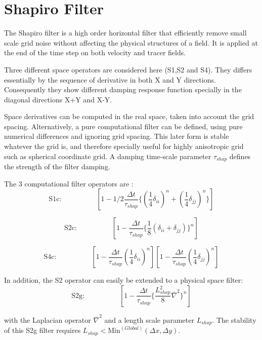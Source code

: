 
\section{Shapiro Filter} 
\label{sec:shapiro-filter}

The Shapiro filter \cite{Shapiro_70} is a high order horizontal 
filter that efficiently remove small scale grid noise 
without affecting the physical structures of a field. 
It is applied at the end of the time step %
on both velocity and tracer fields.

Three different space operators are considered here (S1,S2 and S4).
They differs essentially by the sequence of derivative in
both X and Y directions. Consequently they show different 
damping response function specially in the diagonal directions 
X+Y and X-Y.

Space derivatives can be computed in the real space, 
taken into account the grid spacing. 
Alternatively, a pure computational filter can be defined,
using pure numerical differences and ignoring 
grid spacing. 
This later form is stable whatever the grid is, and therefore
specially useful for highly anisotropic grid such as spherical 
coordinate grid.
A damping time-scale parameter $\tau_{shap}$ 
defines the strength of the filter damping.

The 3 computational filter operators are :
$$
\mathrm{S1c:}\hspace{2cm}
[1 - 1/2 \frac{\Delta t}{\tau_{shap}}
   \{ (\frac{1}{4}\delta_{ii})^n 
    + (\frac{1}{4}\delta_{jj})^n \} ] 
$$

$$
\mathrm{S2c:}\hspace{2cm}
[1 - \frac{\Delta t}{\tau_{shap}} 
\{ \frac{1}{8} (\delta_{ii} + \delta_{jj}) \}^n]
$$

$$
\mathrm{S4c:}\hspace{2cm}
[1 - \frac{\Delta t}{\tau_{shap}} (\frac{1}{4}\delta_{ii})^n]
[1 - \frac{\Delta t}{\tau_{shap}} (\frac{1}{4}\delta_{jj})^n]
$$

In addition, the S2 operator can easily be extended to 
a physical space filter: 
$$
\mathrm{S2g:}\hspace{2cm}
[1 - \frac{\Delta t}{\tau_{shap}} 
\{ \frac{L_{shap}^2}{8} \overline{\nabla}^2 \}^n]
$$

with the Laplacian operator $\overline{\nabla}^2 $
and a length scale parameter $L_{shap}$.
The stability of this S2g filter requires 
$L_{shap} < \mathrm{Min}^{(Global)}(\Delta x,\Delta y)$.

